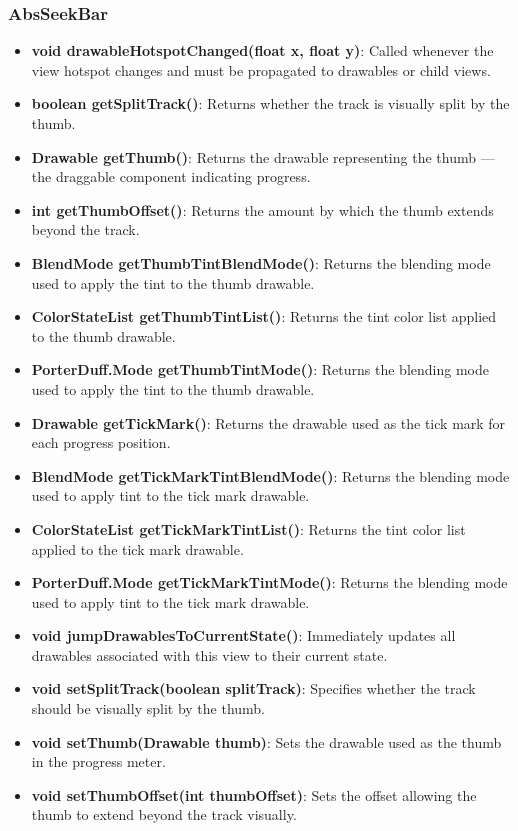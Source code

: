 \documentclass{report}
\begin{document}
\begin{itemize}
    \subsubsection{AbsSeekBar}
    \begin{itemize}
        \item \textbf{void drawableHotspotChanged(float x, float y)}: Called whenever the view hotspot changes and must be propagated to drawables or child views.
        \item \textbf{boolean getSplitTrack()}: Returns whether the track is visually split by the thumb.
        \item \textbf{Drawable getThumb()}: Returns the drawable representing the thumb — the draggable component indicating progress.
        \item \textbf{int getThumbOffset()}: Returns the amount by which the thumb extends beyond the track.
        \item \textbf{BlendMode getThumbTintBlendMode()}: Returns the blending mode used to apply the tint to the thumb drawable.
        \item \textbf{ColorStateList getThumbTintList()}: Returns the tint color list applied to the thumb drawable.
        \item \textbf{PorterDuff.Mode getThumbTintMode()}: Returns the blending mode used to apply the tint to the thumb drawable.
        \item \textbf{Drawable getTickMark()}: Returns the drawable used as the tick mark for each progress position.
        \item \textbf{BlendMode getTickMarkTintBlendMode()}: Returns the blending mode used to apply tint to the tick mark drawable.
        \item \textbf{ColorStateList getTickMarkTintList()}: Returns the tint color list applied to the tick mark drawable.
        \item \textbf{PorterDuff.Mode getTickMarkTintMode()}: Returns the blending mode used to apply tint to the tick mark drawable.
        \item \textbf{void jumpDrawablesToCurrentState()}: Immediately updates all drawables associated with this view to their current state.
        \item \textbf{void setSplitTrack(boolean splitTrack)}: Specifies whether the track should be visually split by the thumb.
        \item \textbf{void setThumb(Drawable thumb)}: Sets the drawable used as the thumb in the progress meter.
        \item \textbf{void setThumbOffset(int thumbOffset)}: Sets the offset allowing the thumb to extend beyond the track visually.

\end{itemize}
\end{itemize}
\end{document}
